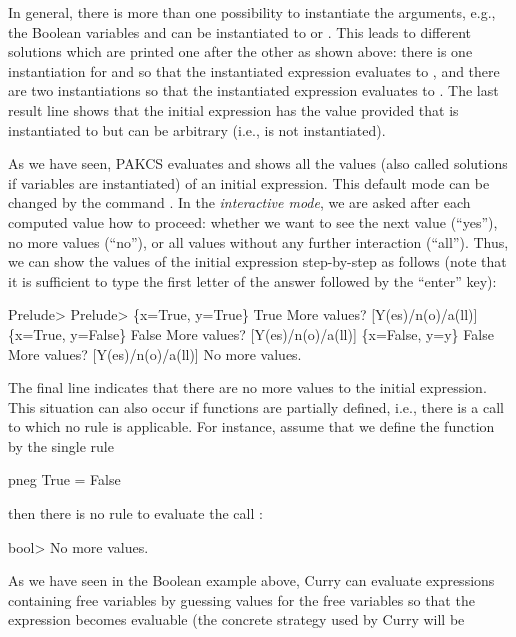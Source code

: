 In general, there is more than one possibility
to instantiate the arguments, e.g., the Boolean variables
 and  can be instantiated to  or .
This leads to different solutions which are printed
one after the other as shown above: there is one instantiation
for  and  so that the instantiated expression
evaluates to , and there are two instantiations
so that the instantiated expression evaluates to .
The last result line shows that the initial expression has the value
 provided that  is instantiated to 
but  can be arbitrary (i.e.,  is not instantiated).

As we have seen, PAKCS evaluates and shows all the values
(also called solutions if variables are instantiated)
of an initial expression. This default mode can be changed
by the command .
In the \emph{interactive mode}, we are asked after each
computed value how to proceed:
whether we want to see the next value (``yes''), no more values (``no''),
or all values without any further interaction (``all'').
Thus, we can show the values of the initial expression
step-by-step as follows (note that it is sufficient to type
the first letter of the answer followed by the ``enter'' key):
\begin{prog}
Prelude> 
Prelude> 
\{x=True, y=True\}  True
More values? [Y(es)/n(o)/a(ll)] 
\{x=True, y=False\} False
More values? [Y(es)/n(o)/a(ll)] 
\{x=False, y=y\} False
More values? [Y(es)/n(o)/a(ll)] 
No more values.
\end{prog}
The final line indicates that there are no more values to the
initial expression. This situation can also occur if functions
are partially defined, i.e., there is a call to which no rule
is applicable. For instance, assume that we define the function
 by the single rule
\begin{prog}
pneg True = False
\end{prog}
then there is no rule to evaluate the call :
\begin{prog}
bool> 
No more values.
\end{prog}
As we have seen in the Boolean example above,
Curry can evaluate expressions containing free variables
by guessing values for the free variables so that the expression
becomes evaluable (the concrete strategy used by Curry will be
